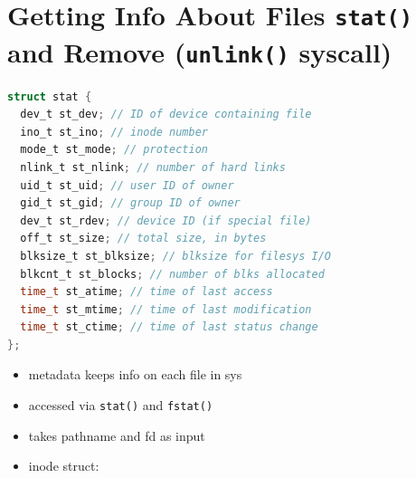 \section*{Getting Info About Files \texttt{stat()} and Remove (\texttt{unlink()} syscall)}
\begin{minipage}{.7\linewidth}
\begin{lstlisting}[language=c]
struct stat {
  dev_t st_dev; // ID of device containing file
  ino_t st_ino; // inode number
  mode_t st_mode; // protection
  nlink_t st_nlink; // number of hard links
  uid_t st_uid; // user ID of owner
  gid_t st_gid; // group ID of owner
  dev_t st_rdev; // device ID (if special file)
  off_t st_size; // total size, in bytes
  blksize_t st_blksize; // blksize for filesys I/O
  blkcnt_t st_blocks; // number of blks allocated
  time_t st_atime; // time of last access
  time_t st_mtime; // time of last modification
  time_t st_ctime; // time of last status change
};
\end{lstlisting}
\end{minipage}
\begin{minipage}{.3\linewidth}
  \flushleft
  \begin{itemize}
  \item metadata keeps info on each file in sys
  \item accessed via \texttt{stat()} and \texttt{fstat()}
  \item takes pathname and fd as input
  \item inode struct:
  \end{itemize}
\end{minipage}
